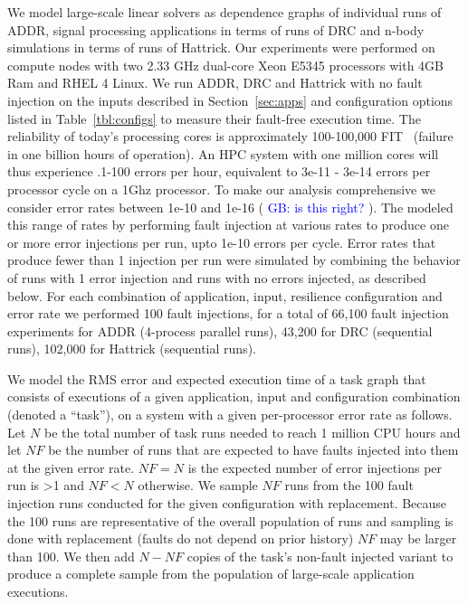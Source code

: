 \documentclass[10pt, conference, compsocconf]{IEEEtran}
\newcommand{\greg}[1]{%
  \textcolor{blue}{GB: #1}
}
\begin{document}
We model large-scale linear solvers as dependence graphs of individual runs of ADDR, signal processing applications in terms of runs of DRC and n-body simulations in terms of runs of Hattrick.
Our experiments were performed on compute nodes with two 2.33 GHz dual-core Xeon E5345 processors with 4GB Ram and RHEL 4 Linux.
We run ADDR, DRC and Hattrick with no fault injection on the inputs described in Section~\ref{sec:apps} and configuration options listed in Table~\ref{tbl:configs} to measure their fault-free execution time.
The reliability of today's processing cores is approximately 100-100,000 FIT~\cite{mem_errors:2010, dram_error:2009} (failure in one billion hours of operation).
An HPC system with one million cores will thus experience .1-100 errors per hour, equivalent to 3e-11 - 3e-14 errors per processor cycle on a 1Ghz processor.
To make our analysis comprehensive we consider error rates between 1e-10 and 1e-16 (\greg{is this right?}).
The modeled this range of rates by performing fault injection at various rates to produce one or more error injections per run, upto 1e-10 errors per cycle. %
Error rates that produce fewer than 1 injection per run were simulated by combining the behavior of runs with 1 error injection and runs with no errors injected, as described below.
For each combination of application, input, resilience configuration and error rate we performed 100 fault injections, for a total of 66,100 fault injection experiments for ADDR (4-process parallel runs), 43,200 for DRC (sequential runs), 102,000 for Hattrick (sequential runs).

We model the RMS error and expected execution time of a task graph that consists of executions of a given application, input and configuration combination (denoted a ``task''), on a system with a given per-processor error rate as follows.
Let $N$ be the total number of task runs needed to reach 1 million CPU hours and let $NF$ be the number of runs that are expected to have faults injected into them at the given error rate.
$NF=N$ is the expected number of error injections per run is >1 and $NF<N$ otherwise.
We sample $NF$ runs from the 100 fault injection runs conducted for the given configuration with replacement.
Because the 100 runs are representative of the overall population of runs and sampling is done with replacement (faults do not depend on prior history) $NF$ may be larger than 100.
We then add $N-NF$ copies of the task's non-fault injected variant to produce a complete sample from the population of large-scale application executions.
\end{document}
